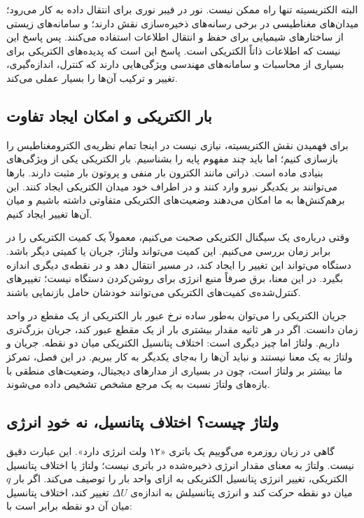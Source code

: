 البته الکتریسیته تنها راه ممکن نیست. نور در فیبر نوری برای انتقال داده به کار می‌رود؛ میدان‌های مغناطیسی در برخی رسانه‌های ذخیره‌سازی نقش دارند؛ و سامانه‌های زیستی از ساختارهای شیمیایی برای حفظ و انتقال اطلاعات استفاده می‌کنند. پس پاسخ این نیست که اطلاعات ذاتاً الکتریکی است. پاسخ این است که پدیده‌های الکتریکی برای بسیاری از محاسبات و سامانه‌های مهندسی ویژگی‌هایی دارند که کنترل، اندازه‌گیری، تغییر و ترکیب آن‌ها را بسیار عملی می‌کند.

\subsection{بار الکتریکی و امکان ایجاد تفاوت}
\label{sub:electric-charge-and-difference}

برای فهمیدن نقش الکتریسیته، نیازی نیست در اینجا تمام نظریه‌ی الکترومغناطیس را بازسازی کنیم؛ اما باید چند مفهوم پایه را بشناسیم. بار الکتریکی یکی از ویژگی‌های بنیادی ماده است. ذراتی مانند الکترون بار منفی و پروتون بار مثبت دارند. بارها می‌توانند بر یکدیگر نیرو وارد کنند و در اطراف خود میدان الکتریکی ایجاد کنند. این برهم‌کنش‌ها به ما امکان می‌دهند وضعیت‌های الکتریکی متفاوتی داشته باشیم و میان آن‌ها تغییر ایجاد کنیم.

وقتی درباره‌ی یک سیگنال الکتریکی صحبت می‌کنیم، معمولاً یک کمیت الکتریکی را در برابر زمان بررسی می‌کنیم. این کمیت می‌تواند ولتاژ، جریان یا کمیتی دیگر باشد. دستگاه می‌تواند این تغییر را ایجاد کند، در مسیر انتقال دهد و در نقطه‌ی دیگری اندازه بگیرد. در این معنا، برق صرفاً منبع انرژی برای روشن‌کردن دستگاه نیست؛ تغییرهای کنترل‌شده‌ی کمیت‌های الکتریکی می‌توانند خودشان حامل بازنمایی باشند.

جریان الکتریکی را می‌توان به‌طور ساده نرخ عبور بار الکتریکی از یک مقطع در واحد زمان دانست. اگر در هر ثانیه مقدار بیشتری بار از یک مقطع عبور کند، جریان بزرگ‌تری داریم. ولتاژ اما چیز دیگری است: اختلاف پتانسیل الکتریکی میان دو نقطه. جریان و ولتاژ به یک معنا نیستند و نباید آن‌ها را به‌جای یکدیگر به کار ببریم. در این فصل، تمرکز ما بیشتر بر ولتاژ است، چون در بسیاری از مدارهای دیجیتال، وضعیت‌های منطقی با بازه‌های ولتاژ نسبت به یک مرجع مشخص تشخیص داده می‌شوند.

\subsection{ولتاژ چیست؟ اختلاف پتانسیل، نه خودِ انرژی}
\label{sub:what-is-voltage}

گاهی در زبان روزمره می‌گوییم یک باتری «۱۲ ولت انرژی دارد». این عبارت دقیق نیست. ولتاژ به معنای مقدار انرژی ذخیره‌شده در باتری نیست؛ ولتاژ یا اختلاف پتانسیل الکتریکی، تغییر انرژی پتانسیل الکتریکی به ازای واحد بار را توصیف می‌کند. اگر بار \(q\) میان دو نقطه حرکت کند و انرژی پتانسیلش به اندازه‌ی \(\Delta U\) تغییر کند، اختلاف پتانسیل میان آن دو نقطه برابر است با:

